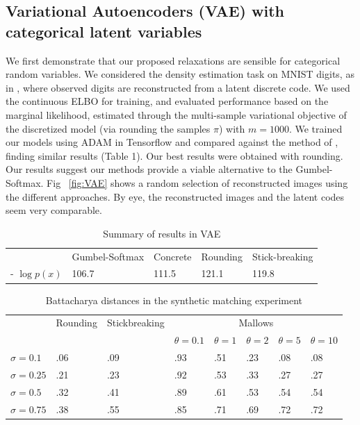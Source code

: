 \documentclass[twoside]{article}
\begin{document}
\subsection{Variational Autoencoders (VAE) with categorical latent variables}
We first demonstrate that our proposed relaxations are sensible for
categorical random variables. We considered the density estimation
task on MNIST digits, as in \cite{maddison2016concrete,
  jang2016categorical}, where observed digits are reconstructed from a
latent discrete code. We used the continuous ELBO for training, and
evaluated performance based on the marginal likelihood, estimated
through the multi-sample variational objective of the discretized
model (via rounding the samples $\pi$) with $m=1000$. We trained our
models using ADAM in Tensorflow and compared against the method of
\cite{jang2016categorical}, finding similar results (Table 1). Our
best results were obtained with rounding. Our results suggest our
methods provide a viable alternative to the Gumbel-Softmax. Fig
~\ref{fig:VAE} shows a random selection of reconstructed images using
the different approaches.  By eye, the reconstructed images
and the latent codes seem very comparable. 


\begin{table}[t]
  \caption{Summary of results in VAE}
  \label{sample-table}
  \centering
  \begin{tabular}{lllll}

 

    & Gumbel-Softmax    & Concrete  & Rounding & Stick-breaking\\
    \cmidrule{2-5}
    - $\log p(x)$ & 106.7  &111.5 & 121.1   &119.8 \\
        \bottomrule
  \end{tabular}
\end{table}


\begin{table}[t]
  \caption{Battacharya distances in the synthetic matching experiment}
  \label{sample-table}
  \centering
  \begin{tabular}{llllllll}
   & \multicolumn{1}{c}{Rounding} & \multicolumn{1}{c}{Stickbreaking} & \multicolumn{5}{c}{Mallows}\\
    \cmidrule(lr){2-2} \cmidrule(lr){3-3} \cmidrule(lr){4-8}
    &    & &   $\theta=0.1$ &  $\theta=1$ & $\theta=2$ & $\theta=5$ & $\theta=10$ \\
    \midrule
    $\sigma=0.1$     & .06 & .09  &.93 &.51& .23  & .08 &.08\\
    $\sigma=0.25$     & .21 & .23 & .92 &.53 & .33&  .27 &.27\\
     $\sigma=0.5$     & .32 & .41 & .89 &.61 & .53&  .54& .54\\
     $\sigma=0.75$     & .38   & .55 & .85 &.71 & .69&  .72 &.72\\
   
    \bottomrule
  \end{tabular}
\end{table}
\end{document}
